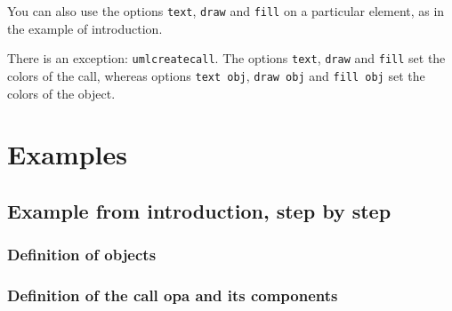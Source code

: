 \documentclass[a4paper,11pt]{report}
\begin{document}
You can also use the options {\tt text}, {\tt draw} and {\tt fill} on a particular element, as in the example of introduction.

There is an exception: {\tt umlcreatecall}. The options {\tt text}, {\tt draw} and {\tt fill} set the colors of the call, whereas options {\tt text obj}, {\tt draw obj} and {\tt fill obj} set the colors of the object.

\medskip

\begin{minipage}{0.6\textwidth}
	
\end{minipage}
\begin{minipage}{0.4\textwidth}
	\begin{center}
	\end{center}
\end{minipage}

\section{Examples}

\subsection{Example from introduction, step by step}

\subsubsection{Definition of objects}

{\color{red!70!black}
	\vspace{-0.4cm}
	
}

\begin{center}
\end{center}

\subsubsection{Definition of the call opa and its components}

\vspace{-0.4cm}
{\color{red!70!black}
	\vspace{-0.4cm}
	\vspace{-0.4cm}
	\vspace{-0.4cm}
	\vspace{-0.4cm}
	\vspace{-0.4cm}
}

\end{document}
